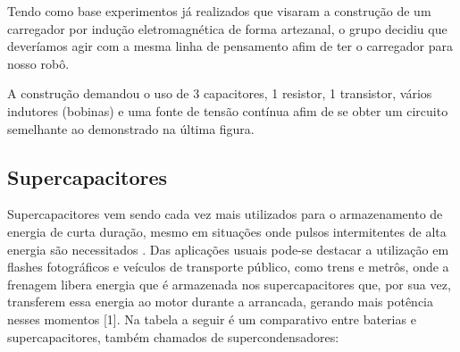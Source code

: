 Tendo como base experimentos já realizados que visaram a construção de um carregador por indução eletromagnética de forma artezanal, o grupo decidiu que deveríamos agir com a mesma linha de pensamento afim de ter o carregador para nosso robô.

A construção demandou o uso de 3 capacitores, 1 resistor, 1 transistor, vários indutores (bobinas) e uma fonte de tensão contínua afim de se obter um circuito semelhante ao demonstrado na última figura.


\subsection{Supercapacitores}
Supercapacitores vem sendo cada vez mais utilizados para o armazenamento de energia de curta duração, mesmo em situações onde pulsos intermitentes de alta energia são necessitados \cite{supercampos}.
Das aplicações usuais pode-se destacar a utilização em flashes fotográficos e veículos de transporte público, como trens e metrôs, onde a frenagem libera energia que é armazenada nos supercapacitores que, por sua vez, transferem essa energia ao motor durante a arrancada, gerando  mais potência nesses momentos [1].
Na tabela a seguir é um comparativo entre baterias e supercapacitores, também chamados de supercondensadores: 

